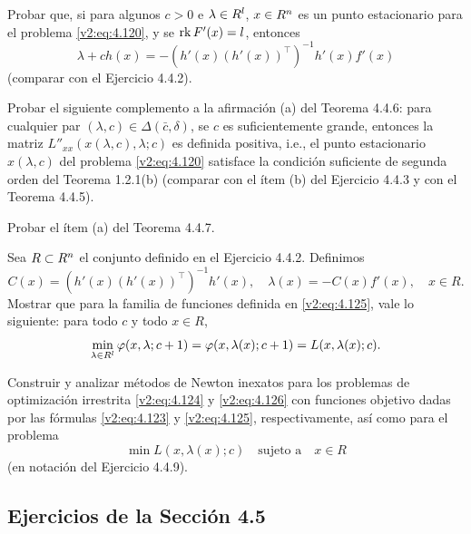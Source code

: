 \begin{exercise}\label{v2:ejer:4.4.6}
    Probar que, si para algunos $c > 0$ e $\lambda \in R^l$, $x \in R^n$ es un punto estacionario para el problema \eqref{v2:eq:4.120}, y se $\operatorname{rk} F'(x) = l$, entonces
    \[
        \lambda + c h(x) = -(h'(x)(h'(x))^\top)^{-1} h'(x) f'(x)
    \]
    (comparar con el Ejercicio 4.4.2).
\end{exercise}

\begin{exercise}\label{v2:ejer:4.4.7}
    Probar el siguiente complemento a la afirmación (a) del Teorema 4.4.6: para cualquier par $(\lambda, c) \in \Delta(\bar{c}, \delta)$, se $c$ es suficientemente grande, entonces la matriz $L''_{xx}(x(\lambda, c), \lambda; c)$ es definida positiva, i.e., el punto estacionario $x(\lambda, c)$ del problema \eqref{v2:eq:4.120} satisface la condición suficiente de segunda orden del Teorema 1.2.1(b) (comparar con el ítem (b) del Ejercicio 4.4.3 y con el Teorema 4.4.5).
\end{exercise}

\begin{exercise}\label{v2:ejer:4.4.8}
    Probar el ítem (a) del Teorema 4.4.7.
\end{exercise}

\begin{exercise}\label{v2:ejer:4.4.9}
    Sea $R \subset R^n$ el conjunto definido en el Ejercicio 4.4.2. Definimos
    \[
        C(x) = (h'(x)(h'(x))^\top)^{-1} h'(x), \quad \lambda(x) = -C(x) f'(x), \quad x \in R.
    \]
    Mostrar que para la familia de funciones definida en \eqref{v2:eq:4.125}, vale lo siguiente: para todo $c$ y todo $x \in R$,
    \[
        \min_{\lambda \in R^l} \varphi(x, \lambda; c + 1) = \varphi(x, \lambda(x); c + 1) = L(x, \lambda(x); c).
    \]
\end{exercise}

\begin{exercise}\label{v2:ejer:4.4.10}
    Construir y analizar métodos de Newton inexatos para los problemas de optimización irrestrita \eqref{v2:eq:4.124} y \eqref{v2:eq:4.126} con funciones objetivo dadas por las fórmulas \eqref{v2:eq:4.123} y \eqref{v2:eq:4.125}, respectivamente, así como para el problema
    \[
        \min L(x, \lambda(x); c) \quad \text{sujeto a} \quad x \in R
    \]
    (en notación del Ejercicio 4.4.9).
\end{exercise}

\subsection*{Ejercicios de la Sección 4.5}

